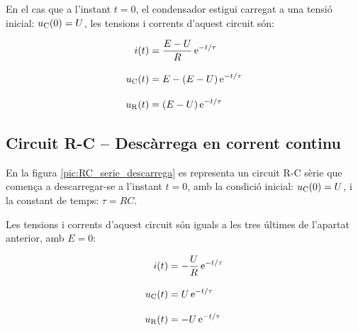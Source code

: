En el cas que a l'instant $t=0$, el condensador  estigui carregat a una tensió inicial: $u_\mathrm{C}(0) = U$, les tensions i corrents d'aquest circuit són:

\hfill
\begin{minipage}[b]{9cm}
    
\end{minipage}
\hfill
\begin{minipage}[b]{6cm}
    \begin{align}
        i(t) &= \frac{E-U}{R}\,\mathrm{e}^{-t/\tau} \\[3mm]
        u_\mathrm{C}(t) &= E  - (E-U) \,\mathrm{e}^{-t/\tau}  \\[3mm]
        u_\mathrm{R}(t) &= (E-U)\,\mathrm{e}^{-t/\tau}
    \end{align}
\end{minipage}


\subsection{Circuit R-C -- Descàrrega en corrent continu}\label{sec:RC-descarrega}

En la figura \vref{pic:RC_serie_descarrega} es representa un circuit R-C sèrie que comença a descarregar-se a l'instant $t=0$, amb la condició inicial: $u_\mathrm{C}(0) = U$, i la constant de temps: $\tau = R C$.
\begin{center}
    
    \label{pic:RC_serie_descarrega}
\end{center}

Les tensions i corrents d'aquest circuit són iguals a les tres últimes de l'apartat anterior, amb $E=0$:

\hfill
\begin{minipage}[b]{9cm}
    
\end{minipage}
\hfill
\begin{minipage}[b]{6cm}
    \begin{align}
        i(t) &= - \frac{U}{R}\,\mathrm{e}^{-t/\tau} \\[3mm]
        u_\mathrm{C}(t) &= U\,\mathrm{e}^{-t/\tau} \\[3mm]
        u_\mathrm{R}(t) &= - U\,\mathrm{e}^{-t/\tau}
    \end{align}
\end{minipage}


